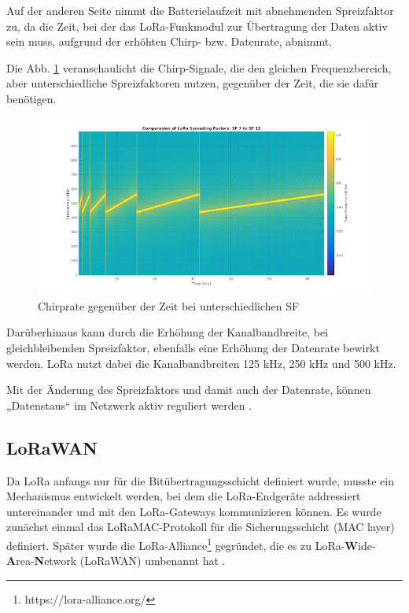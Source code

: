 Auf der anderen Seite nimmt die Batterielaufzeit mit abnehmenden Spreizfaktor zu, da die Zeit, bei der das LoRa-Funkmodul zur Übertragung der Daten aktiv sein muss, aufgrund der erhöhten Chirp- bzw. Datenrate, abnimmt. 

Die Abb. \ref{fig:sf_comparison_7_12} veranschaulicht die Chirp-Signale, die den gleichen Frequenzbereich, aber unterschiedliche Spreizfaktoren nutzen, gegenüber der Zeit, die sie dafür benötigen.  

\begin{figure}[h]
 \centering
 \includegraphics[width=1\textwidth]{pictures/sf_comparison_7_12}
 \caption[Chirprate gegenüber der Zeit bei unterschiedlichen SF]{Chirprate gegenüber der Zeit bei unterschiedlichen SF \cite{sf2017}}
 \label{fig:sf_comparison_7_12}
\end{figure}

Darüberhinaus kann durch die Erhöhung der Kanalbandbreite, bei gleichbleibenden Spreizfaktor, ebenfalls eine Erhöhung der Datenrate bewirkt werden. LoRa nutzt dabei die Kanalbandbreiten 125 kHz, 250 kHz und 500 kHz.

Mit der Änderung des Spreizfaktors und damit auch der Datenrate, können „Datenstaus“ im Netzwerk aktiv reguliert werden \cite{sf2022}. 

\subsection{LoRaWAN} \label{LoRaWAN}

Da LoRa anfangs nur für die Bitübertragungsschicht definiert wurde, musste ein Mechanismus entwickelt werden, bei dem die LoRa-Endgeräte addressiert untereinander und mit den LoRa-Gateways kommunizieren können. Es wurde zunächst einmal das LoRaMAC-Protokoll für die Sicherungsschicht (MAC layer) definiert. Später wurde die LoRa-Alliance\footnote{https://lora-alliance.org/} gegründet, die es zu LoRa-\textbf{W}ide-\textbf{A}rea-\textbf{N}etwork (LoRaWAN) umbenannt hat \cite{semtech2020}.

